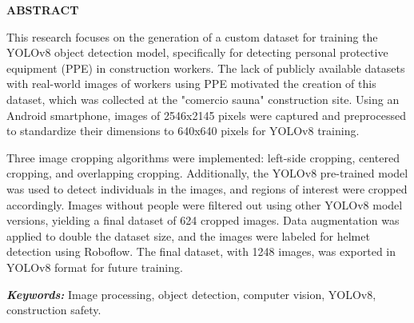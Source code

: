 \thispagestyle{plain}

\newpage

\begin{center}
  \textbf{ABSTRACT}
\end{center}

\vspace{1cm}

This research focuses on the generation of a custom dataset for training the YOLOv8 object detection model, specifically for detecting personal protective equipment (PPE) in construction workers. The lack of publicly available datasets with real-world images of workers using PPE motivated the creation of this dataset, which was collected at the "comercio sauna" construction site. Using an Android smartphone, images of 2546x2145 pixels were captured and preprocessed to standardize their dimensions to 640x640 pixels for YOLOv8 training.

Three image cropping algorithms were implemented: left-side cropping, centered cropping, and overlapping cropping. Additionally, the YOLOv8 pre-trained model was used to detect individuals in the images, and regions of interest were cropped accordingly. Images without people were filtered out using other YOLOv8 model versions, yielding a final dataset of 624 cropped images. Data augmentation was applied to double the dataset size, and the images were labeled for helmet detection using Roboflow. The final dataset, with 1248 images, was exported in YOLOv8 format for future training.

\textit{\textbf{Keywords:}} Image processing, object detection, computer vision, YOLOv8, construction safety.

\vfill

\pagebreak